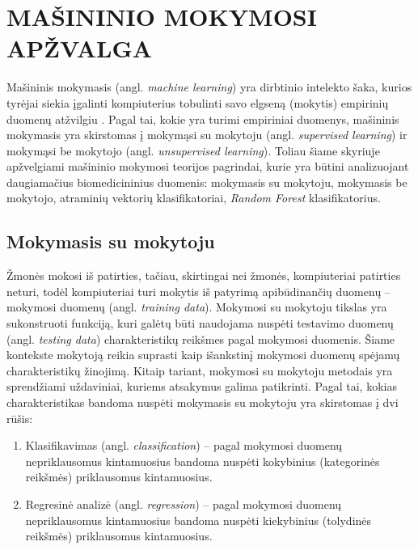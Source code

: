 \section{MAŠININIO MOKYMOSI APŽVALGA}
\label{darbu_apzvalga}

Mašininis mokymasis (angl. \textit{machine learning}) yra dirbtinio intelekto šaka, kurios tyrėjai siekia įgalinti kompiuterius tobulinti savo elgseną (mokytis) empirinių duomenų atžvilgiu \cite{duda2001pattern}. Pagal tai, kokie yra turimi empiriniai duomenys, mašininis mokymasis yra skirstomas į mokymąsi su mokytoju (angl. \textit{supervised learning}) ir mokymąsi be mokytojo (angl. \textit{unsupervised learning}). Toliau šiame skyriuje apžvelgiami mašininio mokymosi teorijos pagrindai, kurie yra būtini analizuojant daugiamačius biomedicininius duomenis: mokymasis su mokytoju, mokymasis be mokytojo, atraminių vektorių klasifikatoriai, \textit{Random Forest} klasifikatorius.

\subsection{Mokymasis su mokytoju}

Žmonės mokosi iš patirties, tačiau, skirtingai nei žmonės, kompiuteriai patirties neturi, todėl kompiuteriai turi mokytis iš patyrimą apibūdinančių duomenų -- mokymosi duomenų (angl. \textit{training data}). Mokymosi su mokytoju tikslas yra sukonstruoti funkciją, kuri galėtų būti naudojama nuspėti testavimo duomenų (angl. \textit{testing data}) charakteristikų reikšmes pagal mokymosi duomenis. Šiame kontekste mokytoją reikia suprasti kaip išankstinį mokymosi duomenų spėjamų charakteristikų žinojimą. Kitaip tariant, mokymosi su mokytoju metodais yra sprendžiami uždaviniai, kuriems atsakymus galima patikrinti. Pagal tai, kokias charakteristikas bandoma nuspėti mokymasis su mokytoju yra skirstomas į dvi rūšis:
\begin{enumerate}
  \item Klasifikavimas (angl. \textit{classification}) -- pagal mokymosi duomenų nepriklausomus kintamuosius bandoma nuspėti kokybinius (kategorinės reikšmės) priklausomus kintamuosius.
  \item Regresinė analizė (angl. \textit{regression}) -- pagal mokymosi duomenų nepriklausomus kintamuosius bandoma nuspėti kiekybinius (tolydinės reikšmės) priklausomus kintamuosius.
\end{enumerate} 


